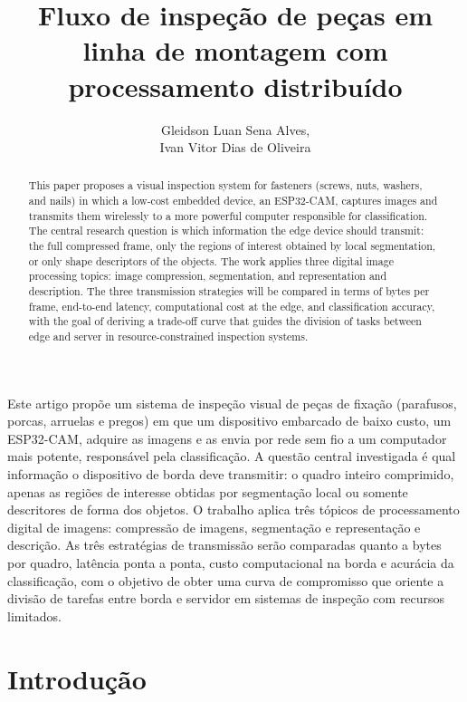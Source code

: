 \documentclass[12pt]{article}
\title{Fluxo de inspeção de peças em linha de montagem com processamento distribuído}
\author{Gleidson Luan Sena Alves\inst{1}, \\ Ivan Vitor Dias de Oliveira\inst{1}}
\begin{document}
\maketitle

\begin{abstract}
  This paper proposes a visual inspection system for fasteners (screws, nuts, washers, and nails) in which a low-cost embedded device, an ESP32-CAM, captures images and transmits them wirelessly to a more powerful computer responsible for classification. The central research question is which information the edge device should transmit: the full compressed frame, only the regions of interest obtained by local segmentation, or only shape descriptors of the objects. The work applies three digital image processing topics: image compression, segmentation, and representation and description. The three transmission strategies will be compared in terms of bytes per frame, end-to-end latency, computational cost at the edge, and classification accuracy, with the goal of deriving a trade-off curve that guides the division of tasks between edge and server in resource-constrained inspection systems.
\end{abstract}

\begin{resumo}
  Este artigo propõe um sistema de inspeção visual de peças de fixação (parafusos, porcas, arruelas e pregos) em que um dispositivo embarcado de baixo custo, um ESP32-CAM, adquire as imagens e as envia por rede sem fio a um computador mais potente, responsável pela classificação. A questão central investigada é qual informação o dispositivo de borda deve transmitir: o quadro inteiro comprimido, apenas as regiões de interesse obtidas por segmentação local ou somente descritores de forma dos objetos. O trabalho aplica três tópicos de processamento digital de imagens: compressão de imagens, segmentação e representação e descrição. As três estratégias de transmissão serão comparadas quanto a bytes por quadro, latência ponta a ponta, custo computacional na borda e acurácia da classificação, com o objetivo de obter uma curva de compromisso que oriente a divisão de tarefas entre borda e servidor em sistemas de inspeção com recursos limitados.
\end{resumo}

\section{Introdução}
\label{sec:introducao}
\end{document}
